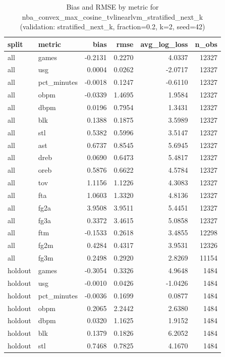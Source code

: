 \begin{table}
\caption{Bias and RMSE by metric for nba_convex_max_cosine_tvlinearlvm_stratified_next_k (validation: stratified_next_k, fraction=0.2, k=2, seed=42)}
\label{tab:nba_convex_max_cosine_tvlinearlvm_stratified_next_k_vs_stratified_next_k_f20_k2_s42_bias_rmse}
\begin{tabular}{llrrrr}
\toprule
split & metric & bias & rmse & avg\_log\_loss & n\_obs \\
\midrule
all & games & -0.2131 & 0.2270 & 4.0337 & 12327 \\
all & usg & 0.0004 & 0.0262 & -2.0717 & 12327 \\
all & pct\_minutes & -0.0018 & 0.1247 & -0.6110 & 12327 \\
all & obpm & -0.0339 & 1.4695 & 1.9584 & 12327 \\
all & dbpm & 0.0196 & 0.7954 & 1.3431 & 12327 \\
all & blk & 0.1388 & 0.1875 & 3.5989 & 12327 \\
all & stl & 0.5382 & 0.5996 & 3.5147 & 12327 \\
all & ast & 0.6737 & 0.8545 & 5.6945 & 12327 \\
all & dreb & 0.0690 & 0.6473 & 5.4817 & 12327 \\
all & oreb & 0.5876 & 0.6622 & 4.5784 & 12327 \\
all & tov & 1.1156 & 1.1226 & 4.3083 & 12327 \\
all & fta & 1.0603 & 1.3320 & 4.8136 & 12327 \\
all & fg2a & 3.9508 & 3.9511 & 5.4451 & 12327 \\
all & fg3a & 0.3372 & 3.4615 & 5.0858 & 12327 \\
all & ftm & -0.1533 & 0.2618 & 3.4855 & 12298 \\
all & fg2m & 0.4284 & 0.4317 & 3.9531 & 12326 \\
all & fg3m & 0.2498 & 0.2920 & 2.8269 & 11154 \\
holdout & games & -0.3054 & 0.3326 & 4.9648 & 1484 \\
holdout & usg & -0.0010 & 0.0426 & -1.0426 & 1484 \\
holdout & pct\_minutes & -0.0036 & 0.1699 & 0.0877 & 1484 \\
holdout & obpm & 0.2065 & 2.2442 & 2.6380 & 1484 \\
holdout & dbpm & 0.0320 & 1.1625 & 1.9152 & 1484 \\
holdout & blk & 0.1379 & 0.1826 & 6.2052 & 1484 \\
holdout & stl & 0.7468 & 0.7825 & 4.1670 & 1484 \\

\end{tabular}
\end{table}
